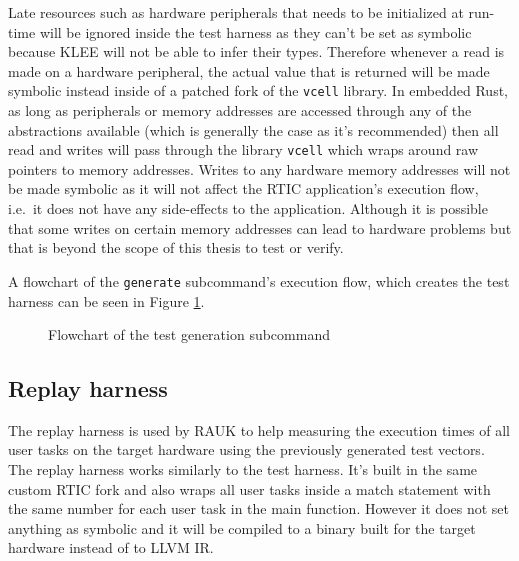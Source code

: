 

Late resources such as hardware peripherals that needs to be initialized at
run-time will be ignored inside the test harness as they can't be set as
symbolic because KLEE will not be able to infer their types. Therefore whenever
a read is made on a hardware peripheral, the actual value that is returned will
be made symbolic instead inside of a patched fork of the \texttt{vcell}
library. In embedded Rust, as long as peripherals or memory addresses are
accessed through any of the abstractions available (which is generally the case
as it's recommended) then all read and writes will pass through the library
\texttt{vcell} which wraps around raw pointers to memory addresses. Writes to
any hardware memory addresses will not be made symbolic as it will not affect
the RTIC application's execution flow, i.e.\ it does not have any side-effects
to the application. Although it is possible that some writes on certain memory
addresses can lead to hardware problems but that is beyond the scope of this
thesis to test or verify.

A flowchart of the \texttt{generate} subcommand's execution flow, which creates
the test harness can be seen in Figure \ref{fig:generatecmd}.
\begin{figure}[H]
    \centering
    \caption{Flowchart of the test generation subcommand}
    \label{fig:generatecmd}
\end{figure}

\subsection{Replay harness}
The replay harness is used by RAUK to help measuring the execution times of all
user tasks on the target hardware using the previously generated test vectors.
The replay harness works similarly to the test harness. It's built in the same
custom RTIC fork and also wraps all user tasks inside a match statement with
the same number for each user task in the main function. However it does not
set anything as symbolic and it will be compiled to a binary built for the
target hardware instead of to LLVM IR.

